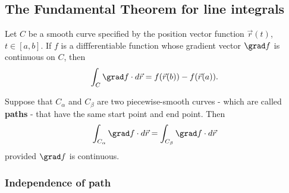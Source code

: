 \documentclass{article}
\begin{document}
\subsection{The Fundamental Theorem for line integrals}


\begin{theorem}
    Let $C$ be a smooth curve specified by the position vector function
    $\vec r(t)$, $t\in[a,b]$. If $f$ is a diffferentiable function
    whose gradient vector $\grad f$ is continuous on $C$, then
    \begin{align*}
        \int_C \grad f\cdot d\vec r = f(\vec r(b)) - f(\vec r(a)).
    \end{align*}
\end{theorem}
\begin{lemma}
    Suppose that $C_\alpha$ and $C_\beta$ are two piecewise-smooth curves
    - which are called \textbf{paths} - that have the same start point and end
    point. Then
    \begin{align*}
        \int_{C_\alpha} \grad f \cdot d\vec r = \int_{C_\beta} \grad f \cdot d\vec r
    \end{align*}
    provided $\grad f$ is continuous.
\end{lemma}

\subsubsection{Independence of path}
\end{document}
